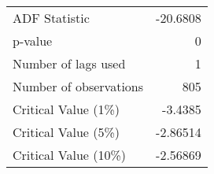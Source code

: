\begin{tabular}{lr}
\toprule
 ADF Statistic          & -20.6808  \\
 p-value                &   0       \\
 Number of lags used    &   1       \\
 Number of observations & 805       \\
 Critical Value (1\%)    &  -3.4385  \\
 Critical Value (5\%)    &  -2.86514 \\
 Critical Value (10\%)   &  -2.56869 \\
\bottomrule
\end{tabular}